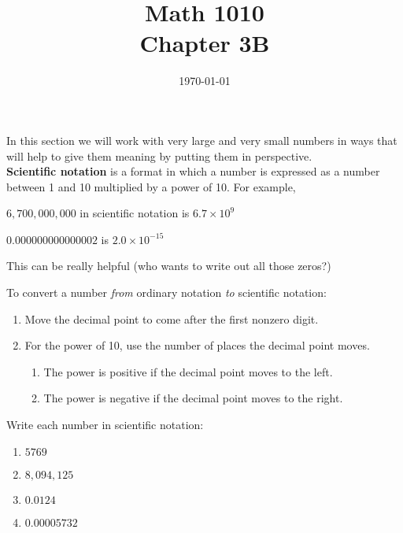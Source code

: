 \documentclass[12pt]{article}
\begin{document}
\title{\bf Math 1010\\Chapter 3B}
\date{\vspace{-0.5in}\today}
\maketitle







In this section we will work with very large and very small numbers in ways that will help to give them meaning by putting them in perspective.\\

\textbf{Scientific notation} is a format in which a number is expressed as a number between 1 and 10 multiplied by a power of 10.  For example,

$6,700,000,000$ in scientific notation is $6.7 \times 10^9$

$0.000000000000002$ is $2.0 \times 10^{-15}$

This can be really helpful (who wants to write out all those zeros?)
\vspace{0.25in}
    		
To convert a number \textit{from} ordinary notation \textit{to} scientific notation:
\begin{enumerate}
\item Move the decimal point to come after the first nonzero digit.
\item For the power of 10, use the number of places the decimal point moves.
\begin{enumerate}
	\item The power is positive if the decimal point moves to the left.
	\item The power is negative if the decimal point moves to the right.
\end{enumerate}
\end{enumerate}
\vspace{0.25in}


Write each number in scientific notation:
\begin{enumerate}
\item $5769$
\item $8,094,125$
\item $0.0124$
\item $0.00005732$
\end{enumerate}
\vspace{0.25in}
\end{document}

